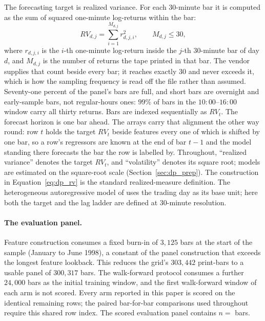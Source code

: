 The forecasting target is realized variance. For each 30-minute bar it is
computed as the sum of squared one-minute log-returns within the bar:
\begin{equation}
    RV_{d,j} = \sum_{i=1}^{M_{d,j}} r_{d,j,i}^{2},
    \qquad M_{d,j} \le 30,
    \label{eq:dp_rv}
\end{equation}
where $r_{d,j,i}$ is the $i$-th one-minute log-return inside the $j$-th
30-minute bar of day $d$, and $M_{d,j}$ is the number of returns the tape
printed in that bar. The vendor supplies that count beside every bar; it
reaches exactly $30$ and never exceeds it, which is how the sampling
frequency is read off the file rather than assumed. Seventy-one percent of
the panel's bars are full, and short bars are overnight and early-sample
bars, not regular-hours ones: $99\%$ of bars in the $10{:}00$--$16{:}00$
window carry all thirty returns. Bars are indexed sequentially as $RV_t$.
The forecast horizon is one bar ahead. The arrays carry that alignment the
other way round: row $t$ holds the target $RV_t$ beside features every one
of which is shifted by one bar, so a row's regressors are known at the end
of bar $t-1$ and the model standing there forecasts the bar the row is
labelled by. Throughout, ``realized variance'' denotes the target $RV_t$,
and ``volatility'' denotes its square root; models are estimated on the
square-root scale (Section~\ref{sec:dp_prep}). The construction in
Equation~\eqref{eq:dp_rv} is the standard realized-measure definition. The
heterogeneous autoregressive model of \citet{Corsi2009} uses the trading
day as its base unit; here both the target and the lag ladder are defined
at 30-minute resolution.

\paragraph{The evaluation panel.}
Feature construction consumes a fixed burn-in of $3{,}125$ bars at the
start of the sample (January to June 1998), a constant of the panel
construction that exceeds the longest feature lookback. This reduces the
grid's $303{,}442$ print-bars to a usable panel of $300{,}317$ bars. The
walk-forward protocol consumes a further $24{,}000$ bars as the initial
training window, and the first walk-forward window of each arm is not
scored. Every
arm reported in this paper is scored on the identical remaining rows; the
paired bar-for-bar comparisons used throughout require this shared row
index. The scored evaluation panel contains $n=$ \unifAzeroN{} bars.

